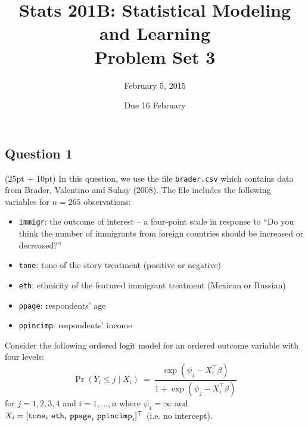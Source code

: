 \documentclass[11pt,english]{article}
\begin{document}
\title{\textbf{Stats 201B: Statistical Modeling and Learning}\\
\textbf{Problem Set 3}}
\author{February 5, 2015}

\date{Due 16 February}
\maketitle

\subsection*{Question 1}
(25pt + 10pt) In this question, we use the file {\tt brader.csv} which contains data from Brader, Valentino and Suhay (2008). The file includes the following variables for $n=265$ observations:
\begin{itemize}
  \addtolength{\itemsep}{-.25\baselineskip}
  \item {\tt immigr}: the outcome of interest -- a four-point scale in response to ``Do you think the number of immigrants from foreign countries should be increased or decreased?''
  \item {\tt tone}: tone of the story treatment (positive or negative)
  \item {\tt eth}: ethnicity of the featured immigrant treatment (Mexican or Russian)
  \item {\tt ppage}: respondents' age
  \item {\tt ppincimp}: respondents' income
\end{itemize}
Consider the following ordered logit model for an ordered outcome variable with four levels:
        $$ \Pr(Y_i \leq j \mid X_i) \ = \ \frac{\exp(\psi_j - X_i^\top\beta)}
            {1 + \exp(\psi_j - X_i^\top\beta)} $$
for $j = 1,2,3,4$ and $i = 1,...,n$ where $\psi_4=\infty$ and $X_i = [{\tt tone}_i \ {\tt eth}_i \ {\tt ppage}_i \ {\tt ppincimp}_i]^\top$ (i.e. no intercept).
\end{document}
